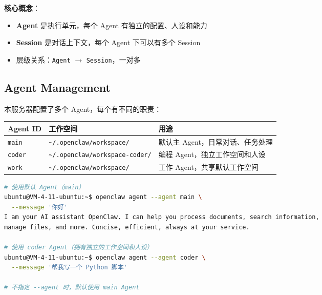 \begin{figure}[htbp]
\centering
{}
\end{figure}

\textbf{核心概念}：

\begin{itemize}
  \item \textbf{Agent} 是执行单元，每个 Agent 有独立的配置、人设和能力
  \item \textbf{Session} 是对话上下文，每个 Agent 下可以有多个 Session
  \item 层级关系：\texttt{Agent} $\rightarrow$ \texttt{Session}，一对多
\end{itemize}

\subsection{Agent Management}


本服务器配置了多个 Agent，每个有不同的职责：

\begin{table}[h]
\centering
\small
\begin{tabular}{|l|l|l|}
\hline
Agent ID & 工作空间 & 用途 \\
\hline
\texttt{main} & \texttt{\textasciitilde{}/.openclaw/workspace/} & 默认主 Agent，日常对话、任务处理 \\
\hline
\texttt{coder} & \texttt{\textasciitilde{}/.openclaw/workspace-coder/} & 编程 Agent，独立工作空间和人设 \\
\hline
\texttt{work} & \texttt{\textasciitilde{}/.openclaw/workspace/} & 工作 Agent，共享默认工作空间 \\
\hline
\end{tabular}
\end{table}

\begin{lstlisting}[language=bash]
# 使用默认 Agent（main）
ubuntu@VM-4-11-ubuntu:~$ openclaw agent --agent main \
  --message '你好'
I am your AI assistant OpenClaw. I can help you process documents, search information,
manage files, and more. Concise, efficient, always at your service.

# 使用 coder Agent（拥有独立的工作空间和人设）
ubuntu@VM-4-11-ubuntu:~$ openclaw agent --agent coder \
  --message '帮我写一个 Python 脚本'

# 不指定 --agent 时，默认使用 main Agent
\end{lstlisting}


